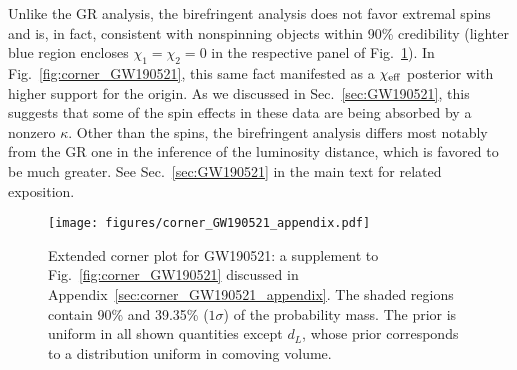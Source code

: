 \documentclass[aps,prd,twocolumn,superscriptaddress,preprintnumbers,floatfix,nofootinbib]{revtex4-2}
\begin{document}
Unlike the \ac{GR} analysis, the birefringent analysis does not favor extremal spins and is, in fact, consistent with nonspinning objects within 90\% credibility (lighter blue region encloses $\chi_1 = \chi_2 = 0$ in the respective panel of Fig.~\ref{fig:corner_GW190521_appendix}).
In Fig.~\ref{fig:corner_GW190521}, this same fact manifested as a $\chi_{\rm eff}$ posterior with higher support for the origin.
As we discussed in Sec.~\ref{sec:GW190521}, this suggests that some of the spin effects in these data are being absorbed by a nonzero $\kappa$.
Other than the spins, the birefringent analysis differs most notably from the \ac{GR} one in the inference of the luminosity distance, which is favored to be much greater.
See Sec.~\ref{sec:GW190521} in the main text for related exposition.


\begin{figure*}[h]
    \texttt{[image: figures/corner\_GW190521\_appendix.pdf]}
    \caption{
        Extended corner plot for GW190521: a supplement to Fig.~\ref{fig:corner_GW190521} discussed in Appendix~\ref{sec:corner_GW190521_appendix}.
        The shaded regions contain 90\% and 39.35\% ($1\sigma$) of the probability mass.
        The prior is uniform in all shown quantities except $d_L$, whose prior corresponds to a distribution uniform in comoving volume.
    }
    \label{fig:corner_GW190521_appendix}
\end{figure*}


\end{document}
